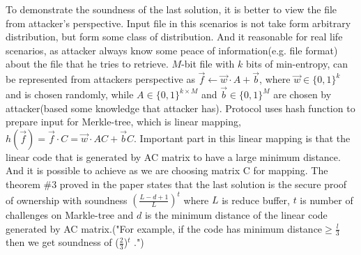 \documentclass[12pt]{article}
\begin{document}
To demonstrate the soundness of the last solution, it is better to view the file from attacker's perspective. Input file in this scenarios is not take form arbitrary distribution, but form some class of distribution. And it reasonable for real life scenarios, as attacker always know some peace of information(e.g. file format) about the file that he tries to retrieve. $M$-bit file with $k$ bits of min-entropy, can be represented from attackers perspective as $\vec{f}\leftarrow\vec{w}\cdot A +\vec{b}$, where $\vec{w} \in \{0,1\}^k$  and is chosen randomly, while $A\in\{0,1\}^{k\times M}$ and $\vec{b}\in\{0,1\}^M$ are chosen by attacker(based some knowledge that attacker has). Protocol uses hash function to prepare input for Merkle-tree, which is linear mapping, $h(\vec{f})=\vec{f}\cdot C = \vec{w}\cdot AC + \vec{b}C$.\cite{PoW} Important part in this linear mapping is that the linear code that is generated by AC matrix to have a large minimum distance. And it is possible to achieve as we are choosing matrix C for mapping. The theorem \#3 proved in the paper states that the last solution is the secure proof of ownership with soundness $\left( \frac{L-d+1}{L}\right)^t$ where $L$ is reduce buffer, $t$ is number of challenges on Markle-tree and $d$ is the minimum distance of the linear code generated by AC matrix.("For example, if the code has minimum distance$\geqslant \frac{l}{3}$ then we get soundness of ($\frac{2}{3}$)$^t$ .")\cite{PoW}\\\\
\end{document}
